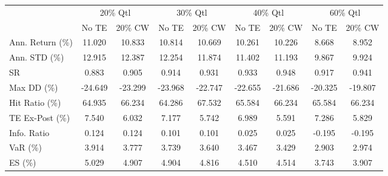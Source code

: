\begin{tabular}{lcccccccc}
\toprule
{} & \multicolumn{2}{c}{20\% Qtl} & \multicolumn{2}{c}{30\% Qtl} & \multicolumn{2}{c}{40\% Qtl} & \multicolumn{2}{c}{60\% Qtl} \\
{} &   No TE &  20\% CW &   No TE &  20\% CW &   No TE &  20\% CW &   No TE &  20\% CW \\
\midrule
Ann. Return (\%) &  11.020 &  10.833 &  10.814 &  10.669 &  10.261 &  10.226 &   8.668 &   8.952 \\
Ann. STD (\%)    &  12.915 &  12.387 &  12.254 &  11.874 &  11.402 &  11.193 &   9.867 &   9.924 \\
SR              &   0.883 &   0.905 &   0.914 &   0.931 &   0.933 &   0.948 &   0.917 &   0.941 \\
Max DD (\%)      & -24.649 & -23.299 & -23.968 & -22.747 & -22.655 & -21.686 & -20.325 & -19.807 \\
Hit Ratio (\%)   &  64.935 &  66.234 &  64.286 &  67.532 &  65.584 &  66.234 &  65.584 &  66.234 \\
TE Ex-Post (\%)  &   7.540 &   6.032 &   7.177 &   5.742 &   6.989 &   5.591 &   7.286 &   5.829 \\
Info. Ratio     &   0.124 &   0.124 &   0.101 &   0.101 &   0.025 &   0.025 &  -0.195 &  -0.195 \\
VaR (\%)         &   3.914 &   3.777 &   3.739 &   3.640 &   3.467 &   3.429 &   2.903 &   2.974 \\
ES (\%)          &   5.029 &   4.907 &   4.904 &   4.816 &   4.510 &   4.514 &   3.743 &   3.907 \\
\bottomrule
\end{tabular}
